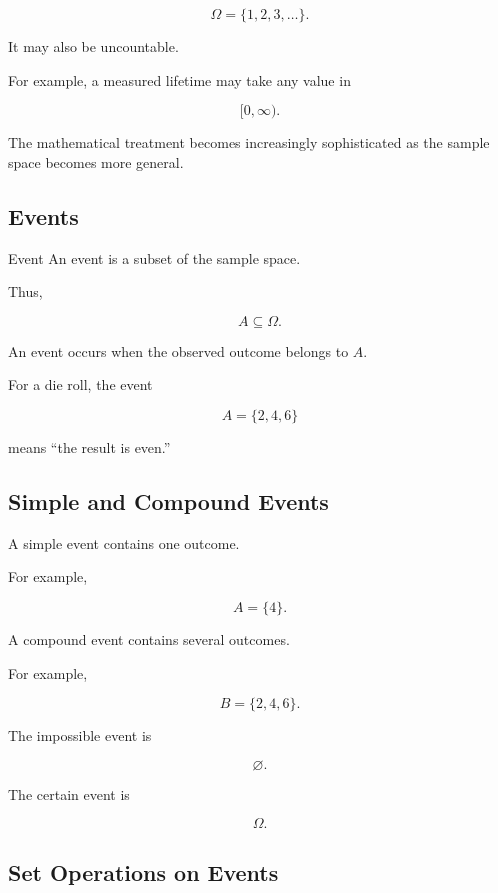 \[
\boxed{
\Omega
=
\{1,2,3,\ldots\}.
}
\]

It may also be uncountable.

For example, a measured lifetime may take any value in

\[
[0,\infty).
\]

The mathematical treatment becomes increasingly sophisticated as the
sample space becomes more general.

\subsection{Events}
\label{subsec:probability-events}

\begin{definitionbox}{Event}
An event is a subset of the sample space.
\end{definitionbox}

Thus,

\[
\boxed{
A\subseteq\Omega.
}
\]

An event occurs when the observed outcome belongs to \(A\).

For a die roll, the event

\[
A=\{2,4,6\}
\]

means ``the result is even.''

\subsection{Simple and Compound Events}
\label{subsec:simple-compound-events}

A simple event contains one outcome.

For example,

\[
A=\{4\}.
\]

A compound event contains several outcomes.

For example,

\[
B=\{2,4,6\}.
\]

The impossible event is

\[
\boxed{
\varnothing.
}
\]

The certain event is

\[
\boxed{
\Omega.
}
\]

\subsection{Set Operations on Events}
\label{subsec:set-operations-events}

